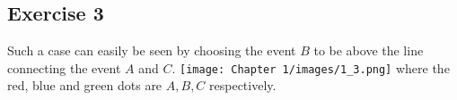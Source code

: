 \subsection{Exercise 3}
Such a case can easily be seen by choosing the event $B$ to be above the line connecting the event $A$ and $C$.
\texttt{[image: Chapter 1/images/1\_3.png]}
where the red, blue and green dots are $A,B,C$ respectively.